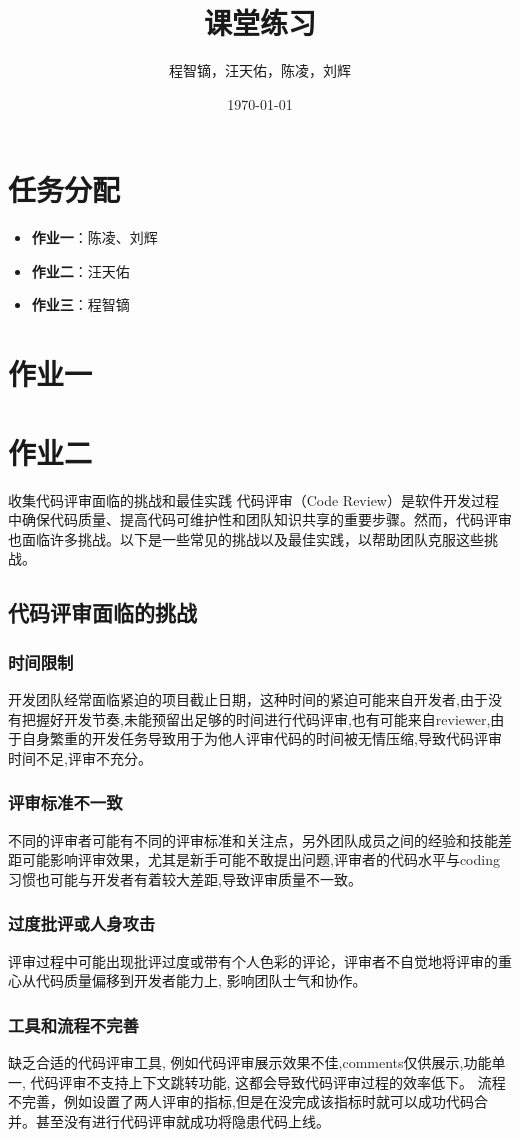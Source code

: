 \documentclass{article}
\title{课堂练习}
\author{程智镝，汪天佑，陈凌，刘辉}
\date{\today}
\begin{document}
\maketitle
\section*{任务分配}
\begin{itemize}
    \item \textbf{作业一}：陈凌、刘辉
    \item \textbf{作业二}：汪天佑
    \item \textbf{作业三}：程智镝
\end{itemize}
\section{作业一}
\section{作业二}
收集代码评审面临的挑战和最佳实践  
代码评审（Code Review）是软件开发过程中确保代码质量、提高代码可维护性和团队知识共享的重要步骤。然而，代码评审也面临许多挑战。以下是一些常见的挑战以及最佳实践，以帮助团队克服这些挑战。
\subsection{代码评审面临的挑战}
\subsubsection{时间限制}
开发团队经常面临紧迫的项目截止日期，这种时间的紧迫可能来自开发者,由于没有把握好开发节奏,未能预留出足够的时间进行代码评审,也有可能来自reviewer,由于自身繁重的开发任务导致用于为他人评审代码的时间被无情压缩,导致代码评审时间不足,评审不充分。
\subsubsection{评审标准不一致}
不同的评审者可能有不同的评审标准和关注点，另外团队成员之间的经验和技能差距可能影响评审效果，尤其是新手可能不敢提出问题,评审者的代码水平与coding习惯也可能与开发者有着较大差距,导致评审质量不一致。
\subsubsection{过度批评或人身攻击}
评审过程中可能出现批评过度或带有个人色彩的评论，评审者不自觉地将评审的重心从代码质量偏移到开发者能力上, 影响团队士气和协作。
\subsubsection{工具和流程不完善}
缺乏合适的代码评审工具, 例如代码评审展示效果不佳,comments仅供展示,功能单一, 代码评审不支持上下文跳转功能, 这都会导致代码评审过程的效率低下。
流程不完善，例如设置了两人评审的指标,但是在没完成该指标时就可以成功代码合并。甚至没有进行代码评审就成功将隐患代码上线。
\end{document}
